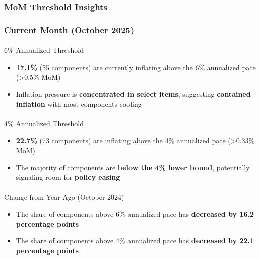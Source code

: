 \documentclass[
  letterpaper,
  DIV=11,
  numbers=noendperiod]{scrartcl}
\makeatletter
\let\oldparagraph\paragraph
\renewcommand{\paragraph}{
    \@ifstar
      \xxxParagraphStar
      \xxxParagraphNoStar
  }
\newcommand{\xxxParagraphStar}[1]{\oldparagraph*{#1}\mbox{}}
\newcommand{\xxxParagraphNoStar}[1]{\oldparagraph{#1}\mbox{}}
\makeatother
\begin{document}
\subsubsection{MoM Threshold Insights}\label{mom-threshold-insights}

\subsubsection{Current Month (October
2025)}\label{current-month-october-2025}

\paragraph{6\% Annualized Threshold}\label{annualized-threshold}

\begin{itemize}
\item
  \textbf{17.1\%} (55 components) are currently inflating above the 6\%
  annualized pace (\textgreater0.5\% MoM)
\item
  Inflation pressure is \textbf{concentrated in select items},
  suggesting \textbf{contained inflation} with most components cooling
\end{itemize}

\paragraph{4\% Annualized Threshold}\label{annualized-threshold-1}

\begin{itemize}
\item
  \textbf{22.7\%} (73 components) are inflating above the 4\% annualized
  pace (\textgreater0.33\% MoM)
\item
  The majority of components are \textbf{below the 4\% lower bound},
  potentially signaling room for \textbf{policy easing}
\end{itemize}

\paragraph{Change from Year Ago (October
2024)}\label{change-from-year-ago-october-2024}

\begin{itemize}
\item
  The share of components above 6\% annualized pace has
  \textbf{decreased by 16.2 percentage points}
\item
  The share of components above 4\% annualized pace has
  \textbf{decreased by 22.1 percentage points}
\end{itemize}
\end{document}
